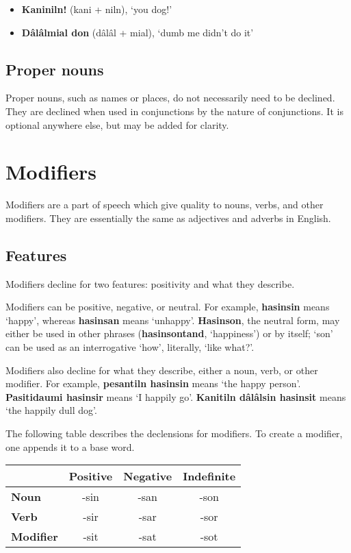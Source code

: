 \documentclass[12pt]{report}
\begin{document}
\begin{itemize}
\item \textbf{Kaniniln!} (kani + niln), `you dog!'
\item \textbf{D\^ al\^ almial don} (d\^ al\^ al + mial), `dumb me didn't do it'
\end{itemize}

\section{Proper nouns}
Proper nouns, such as names or places, do not necessarily need to be declined. They are declined when used in conjunctions by the nature of conjunctions. It is optional anywhere else, but may be added for clarity.

\chapter{Modifiers}
Modifiers are a part of speech which give quality to nouns, verbs, and other modifiers. They are essentially the same as adjectives and adverbs in English.

\section{Features}
Modifiers decline for two features: positivity and what they describe. 

Modifiers can be positive, negative, or neutral. For example, \textbf{hasinsin} means `happy', whereas \textbf{hasinsan} means `unhappy'. \textbf{Hasinson}, the neutral form, may either be used in other phrases (\textbf{hasinsontand}, `happiness') or by itself; `son' can be used as an interrogative `how', literally, `like what?'. 

Modifiers also decline for what they describe, either a noun, verb, or other modifier. For example, \textbf{pesantiln hasinsin} means `the happy person'. \textbf{Pasitidaumi hasinsir} means `I happily go'. \textbf{Kanitiln d\^al\^alsin hasinsit} means `the happily dull dog'.

The following table describes the declensions for modifiers. To create a modifier, one appends it to a base word.

\vspace{5mm}
\begin{tabular}{l | c | c | c |}
  & \textbf{Positive} &  \textbf{Negative} & \textbf{Indefinite}\\ \hline
\textbf{Noun} & -sin &-san&-son\\ \hline
\textbf{Verb} & -sir&-sar &-sor\\ \hline
\textbf{Modifier} &-sit &-sat &-sot\\ \hline
\end{tabular}
\vspace{5mm}
\end{document}
